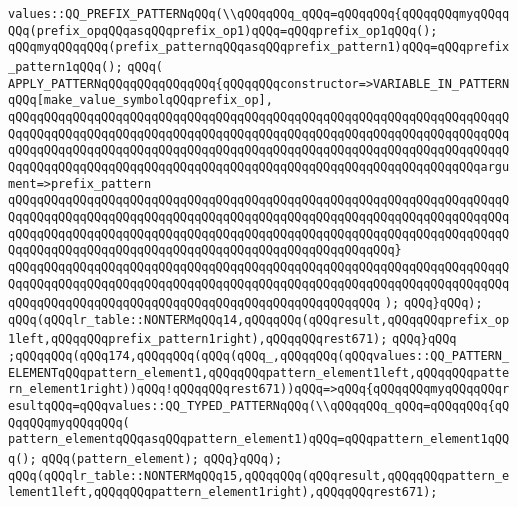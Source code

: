 \verb|values::QQ_PREFIX_PATTERNqQQq(\\qQQqqQQq_qQQq=qQQqqQQq{qQQqqQQqmyqQQqqQQq(prefix_opqQQqasqQQqprefix_op1)qQQq=qQQqprefix_op1qQQq();|\newline
\verb|qQQqmyqQQqqQQq(prefix_patternqQQqasqQQqprefix_pattern1)qQQq=qQQqprefix_pattern1qQQq();|\newline
\verb|qQQq(|\newline
\verb|APPLY_PATTERNqQQqqQQqqQQqqQQq{qQQqqQQqconstructor=>VARIABLE_IN_PATTERNqQQq[make_value_symbolqQQqprefix_op],|\newline
\verb|qQQqqQQqqQQqqQQqqQQqqQQqqQQqqQQqqQQqqQQqqQQqqQQqqQQqqQQqqQQqqQQqqQQqqQQqqQQqqQQqqQQqqQQqqQQqqQQqqQQqqQQqqQQqqQQqqQQqqQQqqQQqqQQqqQQqqQQqqQQqqQQqqQQqqQQqqQQqqQQqqQQqqQQqqQQqqQQqqQQqqQQqqQQqqQQqqQQqqQQqqQQqqQQqqQQqqQQqqQQqqQQqqQQqqQQqqQQqqQQqqQQqqQQqqQQqqQQqqQQqqQQqqQQqqQQqqQQqargument=>prefix_pattern|\newline
\verb|qQQqqQQqqQQqqQQqqQQqqQQqqQQqqQQqqQQqqQQqqQQqqQQqqQQqqQQqqQQqqQQqqQQqqQQqqQQqqQQqqQQqqQQqqQQqqQQqqQQqqQQqqQQqqQQqqQQqqQQqqQQqqQQqqQQqqQQqqQQqqQQqqQQqqQQqqQQqqQQqqQQqqQQqqQQqqQQqqQQqqQQqqQQqqQQqqQQqqQQqqQQqqQQqqQQqqQQqqQQqqQQqqQQqqQQqqQQqqQQqqQQqqQQqqQQqqQQqqQQqqQQq}|\newline
\verb|qQQqqQQqqQQqqQQqqQQqqQQqqQQqqQQqqQQqqQQqqQQqqQQqqQQqqQQqqQQqqQQqqQQqqQQqqQQqqQQqqQQqqQQqqQQqqQQqqQQqqQQqqQQqqQQqqQQqqQQqqQQqqQQqqQQqqQQqqQQqqQQqqQQqqQQqqQQqqQQqqQQqqQQqqQQqqQQqqQQqqQQqqQQqqQQq|\newline
\verb|);|\newline
\verb|qQQq}qQQq);|\newline
\verb|qQQq(qQQqlr_table::NONTERMqQQq14,qQQqqQQq(qQQqresult,qQQqqQQqprefix_op1left,qQQqqQQqprefix_pattern1right),qQQqqQQqrest671);|\newline
\verb|qQQq}qQQq|\newline
\verb|;qQQqqQQq(qQQq174,qQQqqQQq(qQQq(qQQq_,qQQqqQQq(qQQqvalues::QQ_PATTERN_ELEMENTqQQqpattern_element1,qQQqqQQqpattern_element1left,qQQqqQQqpattern_element1right))qQQq!qQQqqQQqrest671))qQQq=>qQQq{qQQqqQQqmyqQQqqQQqresultqQQq=qQQqvalues::QQ_TYPED_PATTERNqQQq(\\qQQqqQQq_qQQq=qQQqqQQq{qQQqqQQqmyqQQqqQQq(|\newline
\verb|pattern_elementqQQqasqQQqpattern_element1)qQQq=qQQqpattern_element1qQQq();|\newline
\verb|qQQq(pattern_element);|\newline
\verb|qQQq}qQQq);|\newline
\verb|qQQq(qQQqlr_table::NONTERMqQQq15,qQQqqQQq(qQQqresult,qQQqqQQqpattern_element1left,qQQqqQQqpattern_element1right),qQQqqQQqrest671);|\newline
